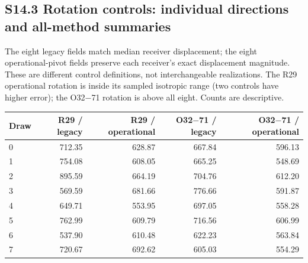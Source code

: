 \documentclass[journal,onecolumn,10pt]{IEEEtran}
\begin{document}
\subsection*{S14.3 Rotation controls: individual directions and all-method summaries}
The eight legacy fields match median receiver displacement; the eight operational-pivot fields preserve each receiver's exact displacement magnitude. These are different control definitions, not interchangeable realizations. The R29 operational rotation is inside its sampled isotropic range (two controls have higher error); the O32$-$71 rotation is above all eight. Counts are descriptive.
\begin{center}\begin{minipage}{\textwidth}\centering\small
{}\label{tab:s-eight-controls}
\begin{tabular}{@{}lrrrr@{}}
\toprule
Draw & R29 / legacy & R29 / operational & O32$-$71 / legacy & O32$-$71 / operational \\
\midrule
0 & 712.35 & 628.87 & 667.84 & 596.13 \\
1 & 754.08 & 608.05 & 665.25 & 548.69 \\
2 & 895.59 & 664.19 & 704.76 & 612.20 \\
3 & 569.59 & 681.66 & 776.66 & 591.87 \\
4 & 649.71 & 553.95 & 697.05 & 558.28 \\
5 & 762.99 & 609.79 & 716.56 & 606.99 \\
6 & 537.90 & 610.48 & 622.23 & 563.84 \\
7 & 720.67 & 692.62 & 605.03 & 554.29 \\
\bottomrule
\end{tabular}
\end{minipage}\end{center}
\begingroup\small
\end{document}
